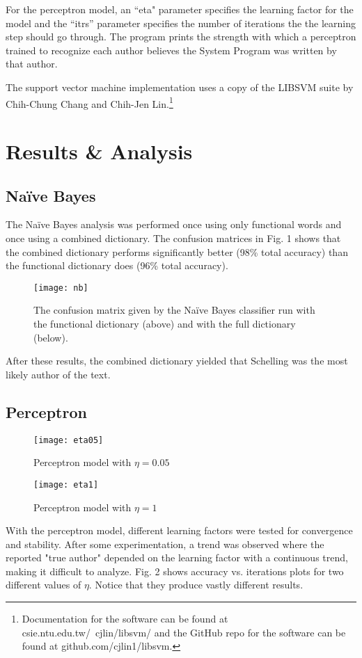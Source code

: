 \documentclass[11pt,letterpaper]{article}
\begin{document}
For the perceptron model, an ``eta" parameter specifies the learning factor for the model and the ``itrs'' parameter specifies the number of iterations the the learning step should go through. The program prints the strength with which a perceptron trained to recognize each author believes the System Program was written by that author.

The support vector machine implementation uses a copy of the LIBSVM suite by Chih-Chung Chang and Chih-Jen Lin.\footnote{Documentation for the software can be found at csie.ntu.edu.tw/~cjlin/libsvm/ and the GitHub repo for the software can be found at github.com/cjlin1/libsvm.}

\section{Results \& Analysis}

\subsection{Na{\"i}ve Bayes}

The Na{\"i}ve Bayes analysis was performed once using only functional words and once using a combined dictionary. The confusion matrices in Fig. 1 shows that the combined dictionary performs significantly better (98\% total accuracy) than the functional dictionary does (96\% total accuracy).

\begin{figure}[h]
	\texttt{[image: nb]}
	\caption{The confusion matrix given by the Na{\"i}ve Bayes classifier run with the functional dictionary (above) and with the full dictionary (below).}
\end{figure}
After these results, the combined dictionary yielded that Schelling was the most likely author of the text.

\subsection{Perceptron}
\begin{figure*}[!t]
	\begin{minipage}{\textwidth}
		\texttt{[image: eta05]}
		\caption{Perceptron model with $\eta=0.05$}
	\end{minipage}
\end{figure*}
\begin{figure*}[!t]
	\begin{minipage}{\textwidth}
		\texttt{[image: eta1]}
		\caption{Perceptron model with $\eta=1$}
	\end{minipage}
\end{figure*}
With the perceptron model, different learning factors were tested for convergence and stability. After some experimentation, a trend was observed where the reported "true author" depended on the learning factor with a continuous trend, making it difficult to analyze. Fig. 2 shows accuracy vs. iterations plots for two different values of $\eta$. Notice that they produce vastly different results.
\end{document}
